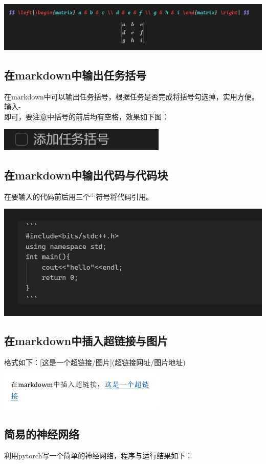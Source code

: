 \documentclass[UTF8,a4paper]{ctexart}
\begin{document}
\begin{sloppypar}
	\includegraphics[width = 16cm]{29}
	
	\subsection{在markdown中输出任务括号}
	在markdown中可以输出任务括号，根据任务是否完成将括号勾选掉，实用方便。输入- \[\] 即可，要注意中括号的前后均有空格，效果如下图：
	
	\includegraphics[width = 8cm]{30}
	
	\subsection{在markdown中输出代码与代码块}
	在要输入的代码前后用三个```符号将代码引用。
	
	\includegraphics[width = 14cm]{31}
	
	\subsection{在markdown中插入超链接与图片}
	格式如下：[这是一个超链接/图片](超链接网址/图片地址)
	
	\includegraphics[width = 8cm]{32}
	
	\subsection{简易的神经网络}
	利用pytorch写一个简单的神经网络，程序与运行结果如下：
	

\end{sloppypar}
\end{document}

